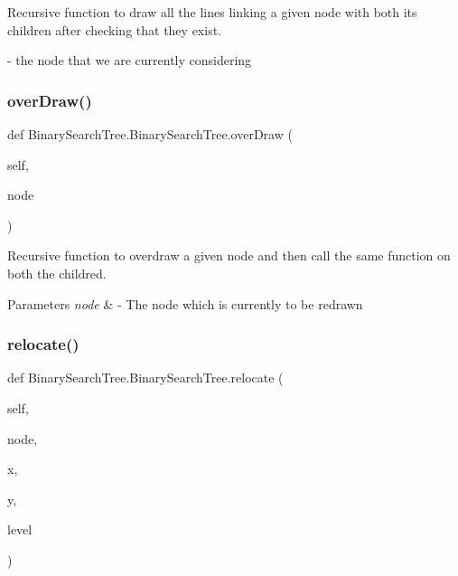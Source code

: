 Recursive function to draw all the lines linking a given node with both its children after checking that they exist. 

-\/ the node that we are currently considering \mbox{\label{class_binary_search_tree_1_1_binary_search_tree_a78d7a635850da8941d434365d6447f75}} 
\subsubsection{\texorpdfstring{over\+Draw()}{overDraw()}}
{\footnotesize\ttfamily def Binary\+Search\+Tree.\+Binary\+Search\+Tree.\+over\+Draw (\begin{DoxyParamCaption}\item[{}]{self,  }\item[{}]{node }\end{DoxyParamCaption})}



Recursive function to overdraw a given node and then call the same function on both the childred. 


\begin{DoxyParams}{Parameters}
{\em node} & -\/ The node which is currently to be redrawn \\
\hline
\end{DoxyParams}
\mbox{\label{class_binary_search_tree_1_1_binary_search_tree_ae3acf8c976ea9f9dd05d381954c430ed}} 
\subsubsection{\texorpdfstring{relocate()}{relocate()}}
{\footnotesize\ttfamily def Binary\+Search\+Tree.\+Binary\+Search\+Tree.\+relocate (\begin{DoxyParamCaption}\item[{}]{self,  }\item[{}]{node,  }\item[{}]{x,  }\item[{}]{y,  }\item[{}]{level }\end{DoxyParamCaption})}



